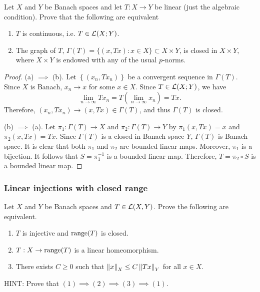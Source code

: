\documentclass[a4paper]{article}
\begin{document}
\begin{thm}
    Let $X$ and $Y$ be Banach spaces and let $T : X \to Y$ 
    be linear (just the algebraic condition).  
    Prove that the following are equivalent
\end{thm}
\begin{enumerate}
\item $T$ is continuous, i.e. $T \in \mathcal{L}(X;Y)$.
\item The graph of $T$, $\Gamma(T) = \{(x,Tx) : x \in X\} 
\subset X \times Y$, is closed in $X \times Y$, where 
$X \times Y$ is endowed with any of the usual $p$-norms.
\end{enumerate}

\begin{proof}
  (a) $\implies$ (b). Let $\left\{ (x_n, T x_n) \right\}$ be a convergent sequence 
  in $\Gamma(T)$. Since $X$ is Banach, $x_n \to x$ for some $x \in X$.
  Since $T \in \mathcal{L}(X ; Y)$, we have 
  \[
  \lim_{n \to \infty} T x_n = T \left( \lim_{n \to \infty} x_n \right) = T x.
  \]
  Therefore, $(x_n, T x_n) \to (x, T x) \in \Gamma(T)$, and thus 
  $\Gamma(T)$ is closed.

  (b) $\implies$ (a). Let $\pi_1 : \Gamma(T) \to X$ and 
  $\pi_2 : \Gamma(T) \to Y$ by 
  $\pi_1 (x, T x) = x$ and $\pi_2 (x, T x) = Tx$. Since 
  $\Gamma(T)$ is a closed in Banach space $Y$, 
  $\Gamma(T)$ is Banach space. It is clear that both $\pi_1$
  and $\pi_2$ are bounded linear maps. Moreover, $\pi_1$ is a 
  bijection. It follows that $S = \pi_1^{-1}$ is a bounded linear 
  map. Therefore, $T = \pi_2 \circ S$ is a bounded linear map. 

\end{proof}

\subsubsection*{Linear injections with closed range}
\begin{thm}
    Let $X$ and $Y$ be Banach spaces and $T \in \mathcal{L}(X,Y)$.  
    Prove the following are equivalent.
\begin{enumerate}
 \item $T$ is injective and $\operatorname{range}(T)$ is closed.
 \item $T : X \to \operatorname{range}(T)$ is a linear homeomorphism.
 \item There exists $C\ge 0$ such that $\left\lVert x\right\rVert_X \le C 
 \left\lVert Tx\right\rVert_Y$ for all $x \in X$.
\end{enumerate}
HINT: Prove that $(1) \implies (2) \implies (3) \implies 
(1)$.
\end{thm}
\end{document}
